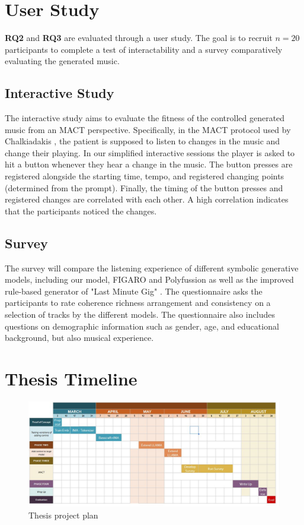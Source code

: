 \section{User Study}
\textbf{RQ2} and \textbf{RQ3} are evaluated through a user study. The goal is to recruit $n=20$ participants to complete a test of interactability and a survey comparatively evaluating the generated music. 
\subsection{Interactive Study}
The interactive study aims to evaluate the fitness of the controlled generated music from an MACT perspective. Specifically, in the MACT protocol used by Chalkiadakis \cite{Chalkiadakis_2022}, the patient is supposed to listen to changes in the music and change their playing. In our simplified interactive sessions the player is asked to hit a button whenever they hear a change in the music. The button presses are registered alongside the starting time, tempo, and registered changing points (determined from the prompt). Finally, the timing of the button presses and registered changes are correlated with each other. A high correlation indicates that the participants noticed the changes. 

\subsection{Survey}
The survey will compare the listening experience of different symbolic generative models, including our model, FIGARO \cite{Rütte_figaro_2023} and Polyfussion \cite{Min_Jiang_Xia_Zhao_polyffusion_2023} as well as the improved rule-based generator of "Last Minute Gig" \cite{Chalkiadakis_2022}\cite{Schlette_2022}. The questionnaire asks the participants to rate coherence richness arrangement and consistency on a selection of tracks by the different models. 
The questionnaire also includes questions on demographic information such as gender, age, and educational background, but also musical experience.

\section{Thesis Timeline}

\begin{figure}[H]
    \centering
    \includegraphics[width=1\textwidth]{IMAGES/project_plan.jpg} 
    \caption{Thesis project plan}
    \label{fig:projectplan}
\end{figure}


